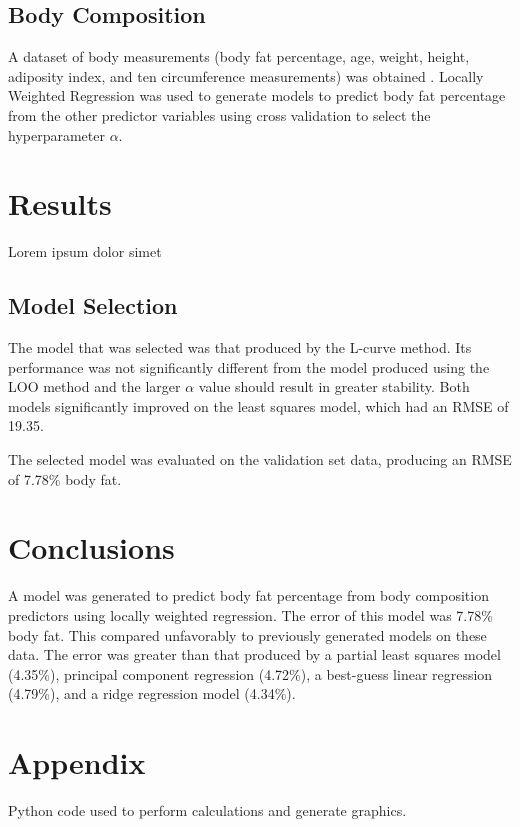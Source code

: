 \documentclass{IEEEtran}
\begin{document}
\subsection{Body Composition}
A dataset of body measurements (body fat percentage, age, weight, height, adiposity index, and ten 
circumference measurements) was obtained \cite{Penrose1985}. Locally Weighted Regression was used to generate models to 
predict body fat percentage from the other predictor variables using cross validation to select 
the hyperparameter $\alpha$.

\section{Results}

\begin{table}[ht]
\caption{Lorem ipsum dolor simet}
\center

\end{table}

\subsection{Model Selection}
The model that was selected was that produced by the L-curve method. Its performance was not significantly 
different from the model produced using the LOO method and the larger $\alpha$ value should result in greater 
stability. Both models significantly improved on the least squares model, which had an RMSE of \num{19.35}.

The selected model was evaluated on the validation set data, producing an RMSE of \num{7.78}\% body fat.
\section{Conclusions}

A model was generated to predict body fat percentage from body composition predictors using locally weighted regression. The error of this model was \num{7.78}\% body fat. This compared unfavorably to previously generated models on these data. The error was greater than that produced by a partial least squares model (\num{4.35}\%), principal component regression (\num{4.72}\%), a best-guess linear regression (\num{4.79}\%), and a ridge regression model (\num{4.34}\%). 

\printbibliography

\onecolumn
\section{Appendix}
Python code used to perform calculations and generate graphics.
\lstset{frame=single}

\end{document}
